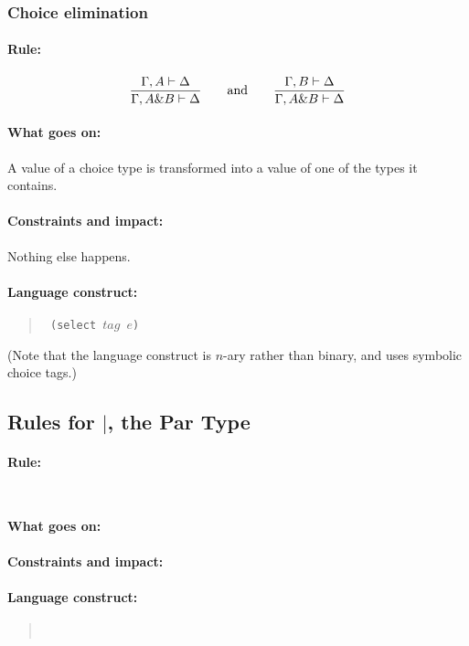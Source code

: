 \documentclass[a4paper]{article}
\begin{document}
\subsubsection{Choice elimination}


\paragraph{Rule:}
$$
{{
  \Gamma, A \vdash \Delta
}\over{
  \Gamma, A \& B \vdash \Delta
}}
\qquad \textrm{and} \qquad
{{
  \Gamma, B \vdash \Delta
}\over{
  \Gamma, A \& B \vdash \Delta
}}
$$

\paragraph{What goes on:} A value of a choice type is transformed into
a value of one of the types it contains.

\paragraph{Constraints and impact:} Nothing else happens.
\paragraph{Language construct:}
\begin{quote}\tt
(select $\mathit{tag}$ $e$)
\end{quote}
(Note that the language construct is $n$-ary rather than binary, and
uses symbolic choice tags.)


\subsection{Rules for $|$, the Par Type}

\paragraph{Rule:}
$$
{
}\over{
}
$$
\paragraph{What goes on:}
\paragraph{Constraints and impact:}
\paragraph{Language construct:}
\begin{quote}\tt
\end{quote}



\end{document}
